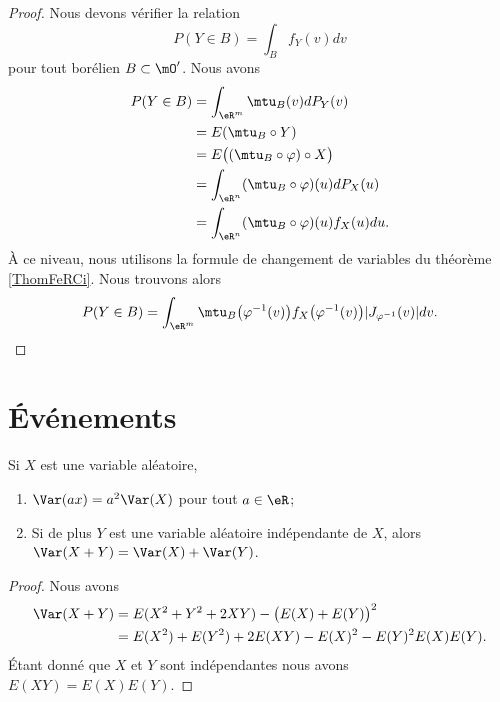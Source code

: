 \begin{proof}
    Nous devons vérifier la relation 
    \begin{equation}
        P(Y\in B)=\int_Bf_Y(v)dv
    \end{equation}
    pour tout borélien \( B\subset \mO'\). Nous avons
    \begin{subequations}
        \begin{align}
            P(Y\in B)&=\int_{\eR^m}\mtu_{B}(v)dP_Y(v)\\
            &=E(\mtu_B\circ Y)\\
            &=E\big( (\mtu_B\circ \varphi)\circ X\big)\\
            &=\int_{\eR^n}(\mtu_B\circ\varphi)(u)dP_X(u)\\
            &=\int_{\eR^n}(\mtu_B \circ\varphi)(u)f_X(u)du.
        \end{align}
    \end{subequations}
    À ce niveau, nous utilisons la formule de changement de variables du théorème \ref{ThomFeRCi}. Nous trouvons alors
    \begin{equation}
        P(Y\in B)=\int_{\eR^m}\mtu_B\big( \varphi^{-1}(v) \big)f_X\big( \varphi^{-1}(v) \big)| J_{\varphi^{-1}}(v) |dv.
    \end{equation}
\end{proof}

\section{Événements}

\begin{lemma}       \label{LemEXYEXEYindep}\label{PropVarPropnnlin}
    Si \( X\) est une variable aléatoire,
    \begin{enumerate}
        \item
            $\Var(ax)=a^2\Var(X)$ pour tout \( a\in\eR\);
        \item
            Si de plus \( Y\) est une variable aléatoire indépendante de \( X\), alors $\Var(X+Y)=\Var(X)+\Var(Y)$.
    \end{enumerate}
\end{lemma}

\begin{proof}
    Nous avons
    \begin{subequations}
        \begin{align}
            \Var(X+Y)&=E(X^2+Y^2+2XY)-\big( E(X)+E(Y) \big)^2\\
            &=E(X^2)+E(Y^2)+2E(XY)-E(X)^2-E(Y)^2E(X)E(Y).
        \end{align}
    \end{subequations}
    Étant donné que \( X\) et \( Y\) sont indépendantes nous avons \( E(XY)=E(X)E(Y)\).
\end{proof}


